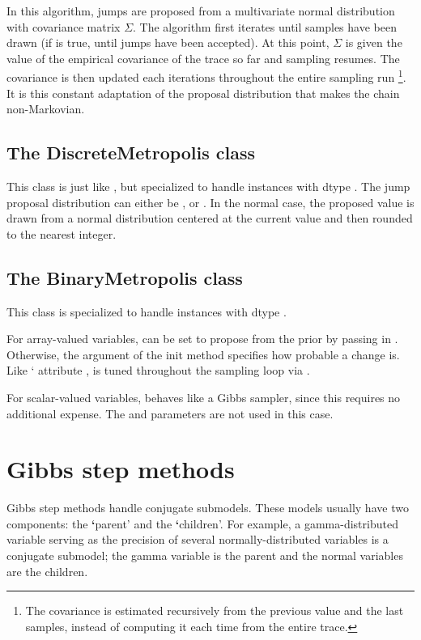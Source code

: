 \documentclass[letterpaper,10pt,english]{sphinxmanual}
\begin{document}
In this algorithm, jumps are proposed from a multivariate normal distribution with covariance matrix $\Sigma$. The algorithm first iterates until  samples have been drawn (if  is true, until  jumps have been accepted). At this point, $\Sigma$ is given the value of the empirical covariance of the trace so far and sampling resumes. The covariance is then updated each  iterations throughout the entire sampling run \footnote{
The covariance is estimated recursively from the previous value and the last
 samples, instead of computing it each time from the entire trace.
}. It is this constant adaptation of the proposal distribution that makes the chain non-Markovian.


\subsection{The DiscreteMetropolis class}
\label{modelfitting:the-discretemetropolis-class}
This class is just like , but specialized to handle  instances with dtype . The jump proposal distribution can either be ,  or . In the normal case, the proposed value is drawn from a normal distribution centered at the current value and then rounded to the nearest integer.


\subsection{The BinaryMetropolis class}
\label{modelfitting:the-binarymetropolis-class}
This class is specialized to handle  instances with dtype
.

For array-valued variables,  can be set to propose from the prior by passing in . Otherwise, the argument  of the init method specifies how probable a change is. Like ` attribute ,  is tuned throughout the sampling loop via .

For scalar-valued variables,  behaves like a Gibbs sampler, since this requires no additional expense. The  and  parameters are not used in this case.


\section{Gibbs step methods}
\label{modelfitting:gibbs-step-methods}\label{modelfitting:gibbs}
Gibbs step methods handle conjugate submodels. These models usually have two components: the {\color{red}\bfseries{}{}`}parent' and the {\color{red}\bfseries{}{}`}children'. For example, a gamma-distributed variable serving as the precision of several normally-distributed variables is a conjugate submodel; the gamma variable is the parent and the normal variables are the children.
\end{document}
